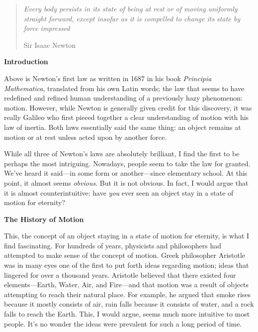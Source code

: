 
\noindent
\begin{quotation}
\textit{Every body persists in its state of being at rest or of moving uniformly straight forward, except insofar as it is compelled to change its state by force impressed}
\begin{flushright}
Sir Isaac Newton
\end{flushright}
\end{quotation}

\noindent
\textbf{Introduction}

Above is Newton’s first law as written in 1687 in his book \emph{Principia Mathematica}, translated from his own Latin words; the law that seems to have redefined and refined human understanding of a previously hazy phenomenon: motion. However, while Newton is generally given credit for this discovery, it was really Galileo who first pieced together a clear understanding of motion with his law of inertia. Both laws essentially said the same thing: an object remains at motion or at rest unless acted upon by another force.

While all three of Newton’s laws are absolutely brilliant, I find the first to be perhaps the most intriguing. Nowadays, people seem to take the law for granted. We’ve heard it said—in some form or another—since elementary school. At this point, it almost seems \emph{obvious}. But it is not obvious. In fact, I would argue that it is almost counterintuitive: have \emph{you} ever seen an object stay in a state of motion for eternity?

\noindent
\textbf{The History of Motion}

This, the concept of an object staying in a state of motion for eternity, is what I find fascinating. For hundreds of years, physicists and philosophers had attempted to make sense of the concept of motion. Greek philosopher Aristotle was in many eyes one of the first to put forth ideas regarding motion; ideas that lingered for over a thousand years. Aristotle believed that there existed four elements—Earth, Water, Air, and Fire—and that motion was a result of objects attempting to reach their natural place. For example, he argued that smoke rises because it mostly consists of air, rain falls because it consists of water, and a rock falls to reach the Earth. This, I would argue, seems much more intuitive to most people. It’s no wonder the ideas were prevalent for such a long period of time.

